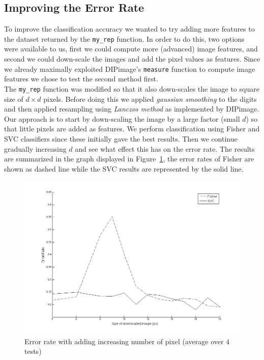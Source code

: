 \documentclass{article}
\begin{document}
\subsection{Improving the Error Rate}

To improve the classification accuracy we wanted to try adding more features to the dataset returned by the \texttt{my\_rep} function. In order to do this, two options were available to us, first we could compute more (advanced) image features, and second we could down-scale the images and add the pixel values as features. Since we already maximally exploited DIPimage's \texttt{measure} function to compute image features we chose to test the second method first. \\

The \texttt{my\_rep} function was modified so that it also down-scales the image to square size of $d \times d$ pixels. Before doing this we applied \emph{gaussian smoothing} to the digits and then applied resampling using \emph{Lanczos method} \cite{lanczos-filtering} as implemented by DIPimage. Our approach is to start by down-scaling the image by a large factor (small $d$) so that little pixels are added as features. We perform classification using Fisher and SVC classifiers since these initially gave the best results. Then we continue gradually increasing $d$ and see what effect this has on the error rate. The results are summarized in the graph displayed in Figure~\ref{fig:error-rate-increasing-pixel-features}, the error rates of Fisher are shown as dashed line while the SVC results are represented by the solid line.

\begin{figure}[H]
    \center
    \includegraphics[trim = 25mm 10mm 25mm 10mm, clip,width=.8\textwidth]{scenario2-adding-pixels.png}
    \caption{Error rate with adding increasing number of pixel (average over $4$ tests) \label{fig:error-rate-increasing-pixel-features}}
\end{figure}
\end{document}
